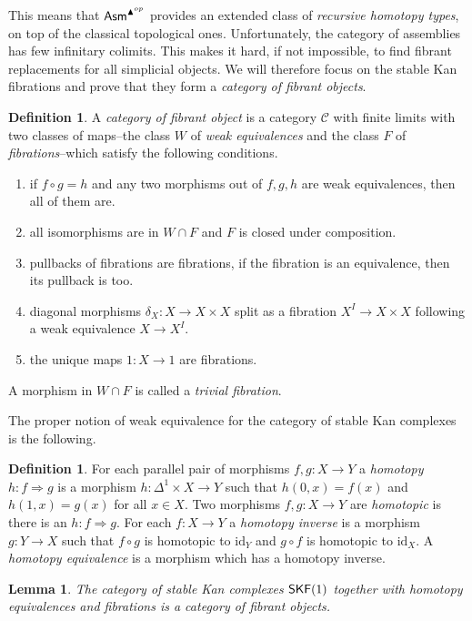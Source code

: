 \documentclass{amsart}
\theoremstyle{plain}
\newtheorem{lemma}[theorem]{Lemma}
\theoremstyle{definition}
\newtheorem{defin}[theorem]{Definition}
\newcommand\cat\mathcal
\newcommand\id{\mathrm{id}}
\begin{document}
This means that $\mathsf{Asm}^{\blacktriangle^{op}}$ provides an extended class of \emph{recursive homotopy types}, on top of the classical topological ones. Unfortunately, the category of assemblies has few infinitary colimits. This makes it hard, if not impossible, to find fibrant replacements for all simplicial objects. We will therefore focus on the stable Kan fibrations and prove that they form a \emph{category of fibrant objects}.

\begin{defin} A \emph{category of fibrant object} is a category $\cat C$ with finite limits with two classes of maps--the class $W$ of \emph{weak equivalences} and the class $F$ of \emph{fibrations}--which satisfy the following conditions.
\begin{enumerate}
\item if $f\circ g = h$ and any two morphisms out of $f,g,h$ are weak equivalences, then all of them are.
\item all isomorphisms are in $W\cap F$ and $F$ is closed under composition.
\item pullbacks of fibrations are fibrations, if the fibration is an equivalence, then its pullback is too.
\item diagonal morphisms $\delta_X:X\to X\times X$ split as a fibration $X^I\to X\times X$ following a weak equivalence $X\to X^I$.
\item the unique maps $1:X\to 1$ are fibrations.
\end{enumerate}
A morphism in $W\cap F$ is called a \emph{trivial fibration}.
\label{catoffib}
\end{defin}

The proper notion of weak equivalence for the category of stable Kan complexes is the following.

\newcommand\hto\Rightarrow
\begin{defin} For each parallel pair of morphisms $f,g:X\to Y$ a \emph{homotopy} $h:f\hto g$ is a morphism $h:\Delta^1\times X\to Y$ such that $h(0,x) = f(x)$ and $h(1,x) = g(x)$ for all $x\in X$. Two morphisms $f,g:X\to Y$ are \emph{homotopic} is there is an $h:f\hto g$. For each $f:X\to Y$ a \emph{homotopy inverse} is a morphism $g:Y\to X$ such that $f\circ g$ is homotopic to $\id_Y$ and $g\circ f$ is homotopic to $\id_X$. A \emph{homotopy equivalence} is a morphism which has a homotopy inverse. \end{defin}

\begin{lemma} The category of stable Kan complexes $\mathsf{SKF}(1)$ together with homotopy equivalences and fibrations is a category of fibrant objects. \end{lemma}
\end{document}
